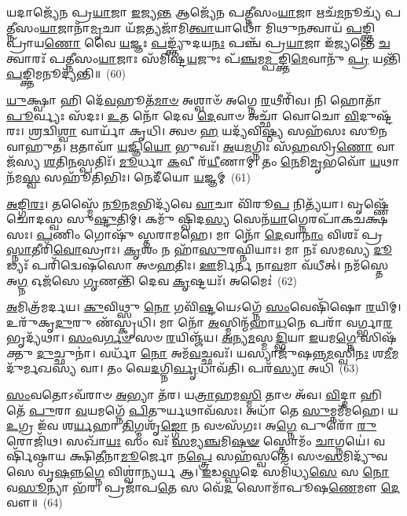 𑌯𑌦𑌾𑌜𑍍𑌯𑍇᳴𑌨 𑌪𑍍𑌰\-\ul{𑌯𑌾}\-𑌜𑌾 \ul{𑌇}\-𑌜𑍍𑌯\-\ul{𑌨𑍍𑌤} 𑌆𑌜𑍍𑌯𑍇᳴𑌨 𑌪𑌤𑍍𑌨𑍀𑌸𑌂\-\ul{𑌯𑌾}\-𑌜𑌾 𑌋𑌚᳴\-\ul{𑌮}\-𑌨𑍂𑌚𑍍𑌯᳴ 𑌪𑌤𑍍𑌨𑍀𑌸𑌂\-\ul{𑌯𑌾}\-𑌜𑌾𑌨𑌾᳴\-\ul{𑌮𑍃}\-𑌚𑌾 𑌯᳴\-\ul{𑌜}\-𑌤𑍍𑌯𑌜𑌾᳴𑌮𑌿\-\ul{𑌤𑍍𑌵𑌾}\-𑌯𑌾𑌥𑍋᳴ 𑌮𑌿𑌥𑍁\-\ul{𑌨}\-𑌤𑍍𑌵𑌾𑌯᳴ \ul{𑌪}\-𑌙𑍍𑌕𑍍𑌤𑌿𑌪𑍍𑌰𑌾᳴𑌯\-\ul{𑌣𑍋} 𑌵𑍈 \ul{𑌯}\-𑌜𑍍𑌞𑌃 \ul{𑌪}\-𑌙𑍍𑌕𑍍𑌤𑍍𑌯𑍁᳴𑌦𑌯\-\ul{𑌨𑌃} 𑌪𑌞𑍍𑌚᳴ 𑌪𑍍𑌰\-\ul{𑌯𑌾}\-𑌜𑌾 𑌇᳴𑌜𑍍𑌯𑌨𑍍𑌤𑍇 \ul{𑌚}\-𑌤𑍍𑌵𑌾𑌰𑌃᳴ 𑌪𑌤𑍍𑌨𑍀𑌸𑌂\-\ul{𑌯𑌾}\-𑌜𑌾𑌃 𑌸᳴𑌮𑌿𑌷𑍍𑌟\-\ul{𑌯}\-𑌜𑍁𑌃 𑌪᳴\-\ul{𑌞𑍍𑌚}\-𑌮\-\ul{𑌮𑍍𑌪}\-𑌙𑍍𑌕𑍍𑌤𑌿\-\ul{𑌮𑍇}\-𑌵𑌾𑌨𑍁᳴ \ul{𑌪𑍍𑌰} 𑌯𑌨𑍍𑌤𑌿᳴ \ul{𑌪}\-𑌙𑍍𑌕𑍍𑌤𑌿𑌮𑌨𑍂𑌦𑍍𑌯᳴𑌨𑍍𑌤𑌿॥~(60)

{\anuvakamend[{\-\ul{𑌪𑍍𑌰}\-𑌜𑌾𑌯𑌾𑌃॑ 𑌕𑌰𑍋\-\ul{𑌤𑌿} 𑌤𑌤𑍍𑌕𑍍𑌰𑌿᳴𑌯\-\ul{𑌤𑍇} 𑌤𑍍𑌰𑌯᳴𑌸𑍍𑌤𑍍𑌰𑌿𑍞𑌶𑌚𑍍𑌚}]}%

\-\ul{𑌯𑍁}\-𑌕𑍍𑌷𑍍𑌵𑌾 𑌹𑌿 𑌦𑍇᳴\-\ul{𑌵}\-𑌹𑍂𑌤᳴\-\ul{𑌮𑌾}\-\-\ul{𑍞} 𑌅𑌶𑍍𑌵𑌾𑍞᳴ 𑌅𑌗𑍍𑌨𑍇 \ul{𑌰}\-𑌥𑍀𑌰𑌿᳴𑌵। 𑌨𑌿 𑌹𑍋𑌤𑌾᳴ \ul{𑌪𑍂}\-𑌰𑍍𑌵𑍍𑌯𑌃 𑌸᳴𑌦𑌃। \ul{𑌉}\-𑌤 𑌨𑍋᳴ 𑌦𑍇𑌵 \ul{𑌦𑍇}\-𑌵𑌾𑍞 𑌅𑌚𑍍𑌛𑌾᳴ 𑌵𑍋𑌚𑍋 \ul{𑌵𑌿}\-𑌦𑍁𑌷𑍍𑌟᳴𑌰𑌃। 𑌶𑍍𑌰𑌦𑍍𑌵𑌿\-\ul{𑌶𑍍𑌵𑌾} 𑌵𑌾𑌰𑍍𑌯𑌾᳴ 𑌕𑍃𑌧𑌿। 𑌤𑍍𑌵𑍞 \ul{𑌹} 𑌯𑌦𑍍𑌯᳴𑌵𑌿\-\ul{𑌷𑍍𑌠𑍍𑌯} 𑌸𑌹᳴𑌸𑌃 𑌸𑍂𑌨𑌵𑌾𑌹𑍁𑌤। \ul{𑌋}\-𑌤𑌾𑌵𑌾᳴ \ul{𑌯}\-𑌜𑍍𑌞𑌿\-\ul{𑌯𑍋} 𑌭𑍁𑌵𑌃᳴। \ul{𑌅}\-𑌯\-\ul{𑌮}\-𑌗𑍍𑌨𑌿𑌃 𑌸᳴\-\ul{𑌹}\-𑌸𑍍𑌰𑌿\-\ul{𑌣𑍋} 𑌵𑌾𑌜᳴𑌸𑍍𑌯 \ul{𑌶}\-𑌤𑌿\-\ul{𑌨}\-𑌸𑍍𑌪𑌤𑌿𑌃᳴। \ul{𑌮𑍂}\-𑌰𑍍𑌧𑌾 \ul{𑌕}\-𑌵𑍀 𑌰᳴\-\ul{𑌯𑍀}\-𑌣𑌾𑌮𑍍। 𑌤𑌂 \ul{𑌨𑍇}\-𑌮𑌿\-\ul{𑌮𑍃}\-𑌭𑌵𑍋᳴ \ul{𑌯}\-𑌥𑌾 𑌨᳴𑌮\-\ul{𑌸𑍍𑌵} 𑌸𑌹𑍂᳴𑌤𑌿𑌭𑌿𑌃। 𑌨𑍇𑌦𑍀᳴𑌯𑍋 \ul{𑌯}\-𑌜𑍍𑌞𑌮𑍍~(61)

\-\ul{𑌅}\-\-\ul{𑌙𑍍𑌗𑌿}\-\-\ul{𑌰𑌃}\-। 𑌤𑌸𑍍𑌮𑍈᳴ \ul{𑌨𑍂}\-𑌨\-\ul{𑌮}\-𑌭𑌿𑌦𑍍𑌯᳴𑌵𑍇 \ul{𑌵𑌾}\-𑌚𑌾 𑌵𑌿᳴𑌰𑍂\-\ul{𑌪} 𑌨𑌿𑌤𑍍𑌯᳴𑌯𑌾। 𑌵𑍃𑌷𑍍𑌣𑍇᳴ 𑌚𑍋𑌦𑌸𑍍𑌵 𑌸𑍁\-\ul{𑌷𑍍𑌟𑍁}\-𑌤𑌿𑌮𑍍। 𑌕𑌮𑍁᳴ 𑌷𑍍𑌵𑌿𑌦\-\ul{𑌸𑍍𑌯} 𑌸𑍇𑌨᳴\-\ul{𑌯𑌾}\-𑌗𑍍𑌨𑍇𑌰𑌪𑌾᳴𑌕𑌚𑌕𑍍𑌷𑌸𑌃। \ul{𑌪}\-𑌣𑌿𑌂 𑌗𑍋𑌷𑍁᳴ 𑌸𑍍𑌤𑌰𑌾𑌮𑌹𑍇। 𑌮𑌾 𑌨𑍋᳴ \ul{𑌦𑍇}\-𑌵𑌾\-\ul{𑌨𑌾𑌂} 𑌵𑌿𑌶𑌃᳴ 𑌪𑍍𑌰\-\ul{𑌸𑍍𑌨𑌾}\-𑌤𑍀𑌰𑌿᳴\-\ul{𑌵𑍋}\-𑌸𑍍𑌰𑌾𑌃। \ul{𑌕𑍃}\-𑌶𑌂 𑌨 𑌹𑌾᳴\-\ul{𑌸𑍁}\-𑌰𑌘𑍍𑌨𑌿᳴𑌯𑌾𑌃। 𑌮𑌾 𑌨𑌃᳴ 𑌸𑌮𑌸𑍍𑌯 \ul{𑌦𑍂}\-𑌢𑍍𑌯𑌃᳴ 𑌪𑌰𑌿᳴𑌦𑍍𑌵𑍇𑌷𑌸𑍋 𑌅𑍞\-\ul{𑌹}\-𑌤𑌿𑌃। \ul{𑌊}\-𑌰𑍍𑌮𑌿𑌰𑍍𑌨 𑌨𑌾\-\ul{𑌵}\-𑌮𑌾 𑌵᳴𑌧𑍀𑌤𑍍। 𑌨𑌮᳴𑌸𑍍𑌤𑍇 𑌅\-\ul{𑌗𑍍𑌨} 𑌓𑌜᳴𑌸𑍇 \ul{𑌗𑍃}\-𑌣𑌨𑍍𑌤𑌿᳴ 𑌦𑍇𑌵 \ul{𑌕𑍃}\-𑌷𑍍𑌟𑌯𑌃᳴। 𑌅𑌮𑍈𑌃॑~(62)

\-\ul{𑌅}\-𑌮𑌿𑌤𑍍𑌰᳴𑌮𑌰𑍍𑌦𑌯। \ul{𑌕𑍁}\-𑌵𑌿𑌥𑍍𑌸𑍁 \ul{𑌨𑍋} 𑌗𑌵𑌿᳴\-\ul{𑌷𑍍𑌟}\-𑌯𑍇\-𑌽𑌗𑍍𑌨𑍇᳴ \ul{𑌸𑌂}\-𑌵𑍇𑌷𑌿᳴𑌷𑍋 \ul{𑌰}\-𑌯𑌿𑌮𑍍। 𑌉𑌰𑍁᳴𑌕𑍃\-\ul{𑌦𑍁}\-𑌰𑍁 𑌣᳴𑌸𑍍𑌕𑍃𑌧𑌿। 𑌮𑌾 𑌨𑍋᳴ \ul{𑌅}\-𑌸𑍍𑌮𑌿𑌨𑍍𑌮᳴𑌹𑌾\-\ul{𑌧}\-𑌨𑍇 𑌪𑌰𑌾᳴ 𑌵𑌰𑍍𑌗𑍍𑌭𑌾\-\ul{𑌰}\-𑌭𑍃𑌦𑍍𑌯᳴𑌥𑌾। \ul{𑌸𑌂}\-𑌵\-\ul{𑌰𑍍𑌗}\-\-\ul{𑍞} 𑌸𑍞 \ul{𑌰}\-𑌯𑌿𑌞𑍍𑌜᳴𑌯। \ul{𑌅}\-𑌨𑍍𑌯\-\ul{𑌮}\-𑌸𑍍𑌮\-\ul{𑌦𑍍𑌭𑌿}\-𑌯𑌾 \ul{𑌇}\-𑌯𑌮\-\ul{𑌗𑍍𑌨𑍇} 𑌸𑌿𑌷᳴𑌕𑍍𑌤𑍁 \ul{𑌦𑍁}\-𑌚𑍍𑌛𑍁𑌨𑌾॑। 𑌵𑌰𑍍𑌧𑌾᳴ \ul{𑌨𑍋} 𑌅𑌮᳴\-\ul{𑌵}\-𑌚𑍍𑌛𑌵𑌃᳴। 𑌯𑌸𑍍𑌯𑌾𑌜𑍁᳴𑌷𑌨𑍍𑌨\-\ul{𑌮}\-𑌸𑍍𑌵𑌿\-\ul{𑌨𑌃} 𑌶\-\ul{𑌮𑍀}\-𑌮𑌦𑍁᳴𑌰𑍍𑌮𑌖𑌸𑍍𑌯 𑌵𑌾। 𑌤𑌂 𑌘𑍇\-\ul{𑌦}\-𑌗𑍍𑌨𑌿\-\ul{𑌰𑍍𑌵𑍃}\-𑌧𑌾𑌵᳴𑌤𑌿। 𑌪𑌰᳴\-\ul{𑌸𑍍𑌯𑌾} 𑌅𑌧𑌿᳴~(63)

\-\ul{𑌸𑌂}\-𑌵𑌤𑍋\-𑌽𑌵᳴𑌰𑌾𑍞 \ul{𑌅}\-𑌭𑍍𑌯𑌾 𑌤᳴𑌰। 𑌯\-\ul{𑌤𑍍𑌰𑌾}\-𑌹𑌮\-\ul{𑌸𑍍𑌮𑌿} 𑌤𑌾𑍞 𑌅᳴𑌵। \ul{𑌵𑌿}\-𑌦𑍍𑌮𑌾 𑌹𑌿 𑌤𑍇᳴ \ul{𑌪𑍁}\-𑌰𑌾 \ul{𑌵}\-𑌯𑌮𑌗𑍍𑌨𑍇᳴ \ul{𑌪𑌿}\-𑌤𑍁𑌰𑍍𑌯𑌥𑌾𑌵᳴𑌸𑌃। 𑌅𑌧𑌾᳴ 𑌤𑍇 \ul{𑌸𑍁}\-𑌮𑍍𑌨𑌮𑍀᳴𑌮𑌹𑍇। 𑌯 \ul{𑌉}\-𑌗𑍍𑌰 𑌇᳴𑌵 𑌶\-\ul{𑌰𑍍𑌯}\-𑌹𑌾 \ul{𑌤𑌿}\-𑌗𑍍𑌮𑌶𑍃᳴\-\ul{𑌙𑍍𑌗𑍋} 𑌨 𑌵𑍞𑌸᳴𑌗𑌃। 𑌅\-\ul{𑌗𑍍𑌨𑍇} 𑌪𑍁𑌰𑍋᳴ \ul{𑌰𑍁}\-𑌰𑍋𑌜𑌿᳴𑌥। 𑌸𑌖𑌾᳴\-\ul{𑌯𑌃} 𑌸𑌂 𑌵𑌃᳴ \ul{𑌸}\-𑌮𑍍𑌯\-\ul{𑌞𑍍𑌚}\-𑌮𑌿\-\ul{𑌷}\-\-\ul{𑍟} 𑌸𑍍𑌤𑍋𑌮𑌂᳴ \ul{𑌚𑌾}\-𑌗𑍍𑌨𑌯𑍇॑। 𑌵𑌰𑍍\mbox{}𑌷𑌿᳴𑌷𑍍𑌠𑌾𑌯 𑌕𑍍𑌷𑌿\-\ul{𑌤𑍀}\-𑌨𑌾\-\ul{𑌮𑍂}\-𑌰𑍍𑌜𑍋 𑌨\-\ul{𑌪𑍍𑌤𑍍𑌰𑍇} 𑌸𑌹᳴𑌸𑍍𑌵𑌤𑍇। 𑌸𑍞\-\ul{𑌸}\-𑌮𑌿𑌦𑍍𑌯𑍁᳴𑌵𑌸𑍇 𑌵𑍃\-\ul{𑌷}\-𑌨𑍍𑌨\-\ul{𑌗𑍍𑌨𑍇} 𑌵𑌿𑌶𑍍𑌵𑌾॑\-\ul{𑌨𑍍𑌯}\-𑌰𑍍𑌯 𑌆। \ul{𑌇}\-𑌡\-\ul{𑌸𑍍𑌪}\-𑌦𑍇 𑌸𑌮𑌿᳴𑌧𑍍𑌯\-\ul{𑌸𑍇} 𑌸 \ul{𑌨𑍋} 𑌵\-\ul{𑌸𑍂}\-𑌨𑍍𑌯𑌾 𑌭᳴𑌰। 𑌪𑍍𑌰𑌜𑌾᳴𑌪\-\ul{𑌤𑍇} 𑌸 𑌵𑍇᳴\-\ul{𑌦} 𑌸𑍋𑌮𑌾᳴𑌪𑍂𑌷\-\ul{𑌣𑍇}\-𑌮𑍗 \ul{𑌦𑍇}\-𑌵𑍗॥~(64)

